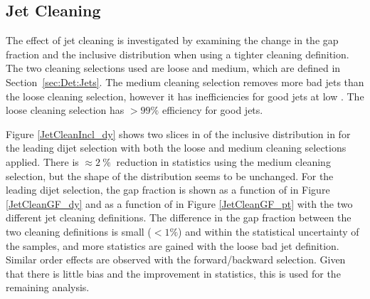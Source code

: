 \subsection{Jet Cleaning}
\label{sec:GBJ1:Cleaning}

The effect of jet cleaning is investigated by examining the change in the gap fraction and the inclusive distribution when using a tighter cleaning definition. 
The two cleaning selections used are loose and medium, which are defined in Section~\ref{sec:Det:Jets}.
The medium cleaning selection removes more bad jets than the loose cleaning selection, however it has inefficiencies for good jets at low \pt{}.
The loose cleaning selection has $>99\%$ efficiency for good jets.

Figure \ref{JetCleanIncl_dy} shows two slices in \ptb{} of the inclusive distribution in \dy{} for the leading \pt{} dijet selection with both the loose and medium cleaning selections applied. 
There is $\approx 2\: \%\: $ reduction in statistics using the medium cleaning selection, but the shape of the distribution seems to be unchanged.  
For the leading \pt{} dijet selection, the gap fraction is shown as a function of \ptb{} in Figure \ref{JetCleanGF_dy} and as a function of \dy{} in Figure \ref{JetCleanGF_pt} with the two different jet cleaning definitions. 
The difference in the gap fraction between the two cleaning definitions is small ($<1\%$) and within the statistical uncertainty of the samples, and more statistics are gained with the loose bad jet definition.
Similar order effects are observed with the forward/backward selection.
Given that there is little bias and the improvement in statistics, this is used for the remaining analysis. 


